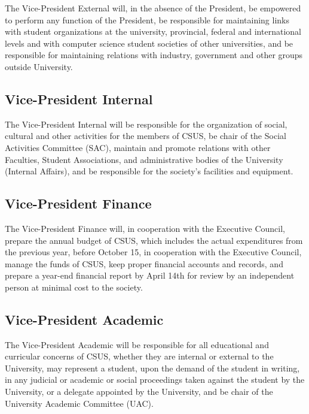 The Vice-President External will, in the absence of the President, be
empowered to perform any function of the President, be responsible for
maintaining links with student organizations at the university,
provincial, federal and international levels and with computer science
student societies of other universities, and be responsible for
maintaining relations with industry, government and other groups outside
University.

\subsection{Vice-President Internal}\label{vice-president-internal}

The Vice-President Internal will be responsible for the organization of
social, cultural and other activities for the members of CSUS, be chair
of the Social Activities Committee (SAC), maintain and promote relations
with other Faculties, Student Associations, and administrative bodies of
the University (Internal Affairs), and be responsible for the society's
facilities and equipment.

\subsection{Vice-President Finance}\label{vice-president-finance}

The Vice-President Finance will, in cooperation with the Executive
Council, prepare the annual budget of CSUS, which includes the actual
expenditures from the previous year, before October 15, in cooperation
with the Executive Council, manage the funds of CSUS, keep proper
financial accounts and records, and prepare a year-end financial report
by April 14th for review by an independent person at minimal cost to the
society.

\subsection{Vice-President Academic}\label{vice-president-academic}

The Vice-President Academic will be responsible for all educational and
curricular concerns of CSUS, whether they are internal or external to
the University, may represent a student, upon the demand of the student
in writing, in any judicial or academic or social proceedings taken
against the student by the University, or a delegate appointed by the
University, and be chair of the University Academic Committee (UAC).

